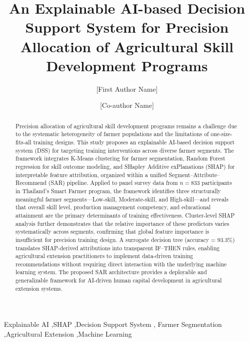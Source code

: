 \documentclass[3p,twocolumn,authoryear]{elsarticle}
\begin{document}
\begin{frontmatter}

\title{An Explainable AI-based Decision Support System for Precision
       Allocation of Agricultural Skill Development Programs}

\author[inst1]{[First Author Name]}

\author[inst1]{[Co-author Name]}


\begin{abstract}
Precision allocation of agricultural skill development programs
remains a challenge due to the systematic heterogeneity of farmer
populations and the limitations of one-size-fits-all training designs.
This study proposes an explainable AI-based decision support system
(DSS) for targeting training interventions across diverse farmer
segments.
The framework integrates K-Means clustering for farmer segmentation,
Random Forest regression for skill outcome modeling, and
SHapley Additive exPlanations (SHAP) for interpretable feature
attribution, organized within a unified
Segment--Attribute--Recommend (SAR) pipeline.
Applied to panel survey data from $n = 833$ participants in
Thailand's Smart Farmer program, the framework identifies three
structurally meaningful farmer segments---Low-skill, Moderate-skill,
and High-skill---and reveals that overall skill level, production
management competency, and educational attainment are the primary
determinants of training effectiveness.
Cluster-level SHAP analysis further demonstrates that the relative
importance of these predictors varies systematically across segments,
confirming that global feature importance is insufficient for
precision training design.
A surrogate decision tree (accuracy = 93.3\%) translates
SHAP-derived attributions into transparent IF--THEN rules,
enabling agricultural extension practitioners to implement
data-driven training recommendations without requiring direct
interaction with the underlying machine learning system.
The proposed SAR architecture provides a deployable and
generalizable framework for AI-driven human capital development
in agricultural extension systems.
\end{abstract}

\begin{keyword}
Explainable AI \sep SHAP \sep Decision Support System \sep
Farmer Segmentation \sep Agricultural Extension \sep Machine Learning
\end{keyword}

\end{frontmatter}
\end{document}

